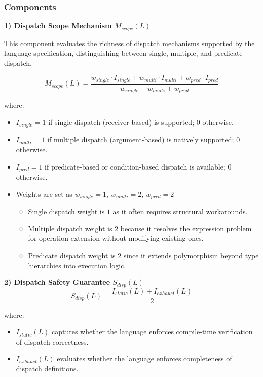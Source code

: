 \subsubsection{Components}

\textbf{1) Dispatch Scope Mechanism $M_{scope}(L)$}

This component evaluates the richness of dispatch mechanisms supported by the language specification, distinguishing between single, multiple, and predicate dispatch.

\[
M_{scope}(L) = \frac{w_{single} \cdot I_{single} + w_{multi} \cdot I_{multi} + w_{pred} \cdot I_{pred}}{w_{single} + w_{multi} + w_{pred}}
\]

where:
\begin{itemize}
    \item $I_{single} = 1$ if single dispatch (receiver-based) is supported; $0$ otherwise.
    \item $I_{multi} = 1$ if multiple dispatch (argument-based) is natively supported; $0$ otherwise.
    \item $I_{pred} = 1$ if predicate-based or condition-based dispatch is available; $0$ otherwise.
    \item Weights are set as $w_{single}=1$, $w_{multi}=2$, $w_{pred}=2$
        \begin{itemize}
            \item Single dispatch weight is $1$ as it often requires structural workarounds. 
            \item Multiple dispatch weight is $2$ because it resolves the expression problem for operation extension without modifying existing ones. 
            \item Predicate dispatch weight is $2$ since it extends polymorphism beyond type hierarchies into execution logic.
        \end{itemize}
\end{itemize}

\textbf{2) Dispatch Safety Guarantee $S_{disp}(L)$}
\[
S_{disp}(L) = \frac{I_{static}(L) + I_{exhaust}(L)}{2}
\]

where:
\begin{itemize}
    \item $I_{static}(L)$ captures whether the language enforces compile-time verification of dispatch correctness.
    \item $I_{exhaust}(L)$ evaluates whether the language enforces completeness of dispatch definitions.
\end{itemize}

